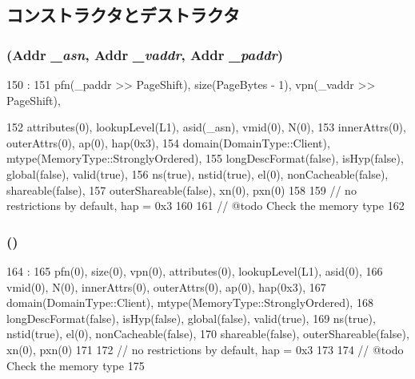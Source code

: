 \subsection{コンストラクタとデストラクタ}
\hypertarget{structArmISA_1_1TlbEntry_ad54289f363defd185361d4c812a4fca5}{
\subsubsection[{TlbEntry}]{ ({\bf Addr} {\em \_\-asn}, \/  {\bf Addr} {\em \_\-vaddr}, \/  {\bf Addr} {\em \_\-paddr})}}
\label{structArmISA_1_1TlbEntry_ad54289f363defd185361d4c812a4fca5}



\begin{DoxyCode}
150                                                   :
151          pfn(_paddr >> PageShift), size(PageBytes - 1), vpn(_vaddr >> PageShift),
      
152          attributes(0), lookupLevel(L1), asid(_asn), vmid(0), N(0),
153          innerAttrs(0), outerAttrs(0), ap(0), hap(0x3),
154          domain(DomainType::Client),  mtype(MemoryType::StronglyOrdered),
155          longDescFormat(false), isHyp(false), global(false), valid(true),
156          ns(true), nstid(true), el(0), nonCacheable(false), shareable(false),
157          outerShareable(false), xn(0), pxn(0)
158     {
159         // no restrictions by default, hap = 0x3
160 
161         // @todo Check the memory type
162     }

\end{DoxyCode}
\hypertarget{structArmISA_1_1TlbEntry_ad069716fb78ffaa2d9bfba679a8eac9a}{
\subsubsection[{TlbEntry}]{ ()}}
\label{structArmISA_1_1TlbEntry_ad069716fb78ffaa2d9bfba679a8eac9a}



\begin{DoxyCode}
164                :
165          pfn(0), size(0), vpn(0), attributes(0), lookupLevel(L1), asid(0),
166          vmid(0), N(0), innerAttrs(0), outerAttrs(0), ap(0), hap(0x3),
167          domain(DomainType::Client), mtype(MemoryType::StronglyOrdered),
168          longDescFormat(false), isHyp(false), global(false), valid(true),
169          ns(true), nstid(true), el(0), nonCacheable(false),
170          shareable(false), outerShareable(false), xn(0), pxn(0)
171     {
172         // no restrictions by default, hap = 0x3
173 
174         // @todo Check the memory type
175     }

\end{DoxyCode}


